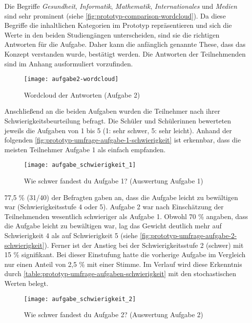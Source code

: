 Die Begriffe \textit{Gesundheit}, \textit{Informatik}, \textit{Mathematik}, \textit{Internationales} und \textit{Medien} sind sehr prominent (siehe \autoref{fig:prototyp-comparison-wordcloud}). Da diese Begriffe die inhaltlichen Kategorien im Prototyp repräsentieren und sich die Werte in den beiden Studiengängen unterscheiden, sind sie die richtigen Antworten für die Aufgabe. Daher kann die anfänglich genannte These, dass das Konzept verstanden wurde, bestätigt werden. Die Antworten der Teilnehmenden sind im Anhang ausformuliert vorzufinden.

\begin{figure}[H]
    \centering
    \texttt{[image: aufgabe2-wordcloud]}
    \caption{Wordcloud der Antworten (Aufgabe 2)}
    \label{fig:prototyp-comparison-wordcloud}
\end{figure}

Anschließend an die beiden Aufgaben wurden die Teilnehmer nach ihrer Schwierigkeitsbeurteilung befragt. Die Schüler und Schülerinnen bewerteten jeweils die Aufgaben von 1 bis 5 (1: sehr schwer, 5: sehr leicht). Anhand der folgenden \autoref{fig:prototyp-umfrage-aufgabe-1-schwierigkeit} ist erkennbar, dass die meisten Teilnehmer Aufgabe 1 als einfach empfanden.

\begin{figure}[H]
    \centering
    \texttt{[image: aufgabe\_schwierigkeit\_1]}
    \caption{Wie schwer fandest du Aufgabe 1? (Auswertung Aufgabe 1)}
    \label{fig:prototyp-umfrage-aufgabe-1-schwierigkeit}
\end{figure}

77,5 \% (31/40) der Befragten gaben an, dass die Aufgabe leicht zu bewältigen war (Schwierigkeitsstufe 4 oder 5). Aufgabe 2 war nach Einschätzung der Teilnehmenden wesentlich schwieriger als Aufgabe 1. Obwohl 70 \% angaben, dass die Aufgabe leicht zu bewältigen war, lag das Gewicht deutlich mehr auf Schwierigkeit 4 als auf Schwierigkeit 5 (siehe \autoref{fig:prototyp-umfrage-aufgabe-2-schwierigkeit}). Ferner ist der Anstieg bei der Schwierigkeitsstufe 2 (schwer) mit 15 \% signifikant. Bei dieser Einstufung hatte die vorherige Aufgabe im Vergleich nur einen Anteil von 2,5 \% mit einer Stimme. Im Verlauf wird diese Erkenntnis durch \autoref{table:prototyp-umfrage-aufgaben-schwierigkeit} mit den stochastischen Werten belegt.

\begin{figure}[H]
    \centering
    \texttt{[image: aufgabe\_schwierigkeit\_2]}
    \caption{Wie schwer fandest du Aufgabe 2? (Auswertung Aufgabe 2)}
    \label{fig:prototyp-umfrage-aufgabe-2-schwierigkeit}
\end{figure}


